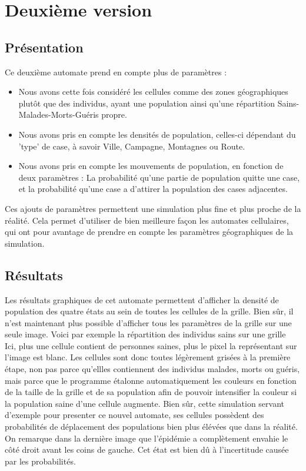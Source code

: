\documentclass{article}
\begin{document}
\section{Deuxième version}

\subsection{Présentation}
	Ce deuxième automate prend en compte plus de paramètres : 
	\begin{itemize}
	\item Nous avons cette fois considéré les cellules comme des zones géographiques plutôt que des individus, ayant une population ainsi qu'une répartition Sains-Malades-Morts-Guéris propre.
	\item Nous avons pris en compte les densités de population, celles-ci dépendant du 'type' de case, à savoir Ville, Campagne, Montagnes ou Route.
	\item Nous avons pris en compte les mouvements de population, en fonction de deux paramètres : La probabilité qu'une partie de population quitte une case, et la probabilité qu'une case a d'attirer la population des cases adjacentes.
	\end{itemize}
	
	Ces ajouts de paramètres permettent une simulation plus fine et plus proche de la réalité. Cela permet d'utiliser de bien meilleure façon les automates cellulaires, qui ont pour avantage de prendre en compte les paramètres géographiques de la simulation.


\subsection{Résultats}

Les résultats graphiques de cet automate permettent d'afficher la densité de population des quatre états au sein de toutes les cellules de la grille. Bien sûr, il n'est maintenant plus possible d'afficher tous les paramètres de la grille sur une seule image. Voici par exemple la répartition des individus sains sur une grille \\[0.6cm]


Ici, plus une cellule contient de personnes saines, plus le pixel la représentant sur l'image est blanc. Les cellules sont donc toutes légèrement grisées à la première étape, non pas parce qu'ellles contiennent des individus malades, morts ou guéris, mais parce que le programme étalonne automatiquement les couleurs en fonction de la taille de la grille et de sa population afin de pouvoir intensifier la couleur si la population saine d'une cellule augmente.
Bien sûr, cette simulation servant d'exemple pour presenter ce nouvel automate, ses cellules possèdent des probabilités de déplacement des populations bien plus élévées que dans la réalité.
On remarque dans la dernière image que l'épidémie a complètement envahie le côté droit avant les coins de gauche. Cet état est bien dû à l'incertitude causée par les probabilités.
\end{document}
